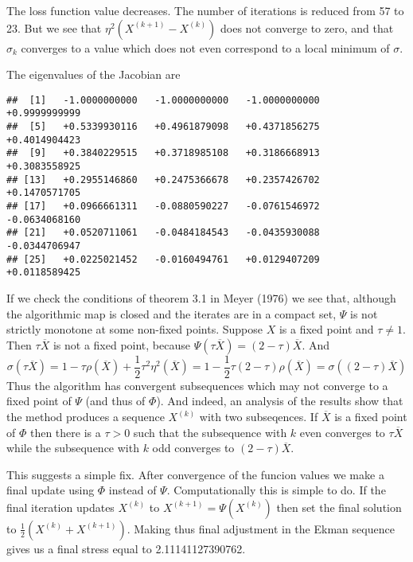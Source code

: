 \documentclass[
  12pt,
]{article}
\begin{document}
The loss function value decreases. The number of iterations is reduced from 57 to 23.
But we see that \(\eta^2(X^{(k+1)}-X^{(k)})\) does not converge to zero, and that \(\sigma_k\) converges to a value which does not even correspond to a local minimum of \(\sigma\).

The eigenvalues of the Jacobian are

\begin{verbatim}
##  [1]   -1.0000000000   -1.0000000000   -1.0000000000   +0.9999999999
##  [5]   +0.5339930116   +0.4961879098   +0.4371856275   +0.4014904423
##  [9]   +0.3840229515   +0.3718985108   +0.3186668913   +0.3083558925
## [13]   +0.2955146860   +0.2475366678   +0.2357426702   +0.1470571705
## [17]   +0.0966661311   -0.0880590227   -0.0761546972   -0.0634068160
## [21]   +0.0520711061   -0.0484184543   -0.0435930088   -0.0344706947
## [25]   +0.0225021452   -0.0160494761   +0.0129407209   +0.0118589425
\end{verbatim}

If we check the conditions of theorem 3.1 in Meyer (1976) we see that, although the
algorithmic map is closed and the iterates are in a compact set, \(\Psi\)
is not strictly monotone at some non-fixed points. Suppose \(X\) is a fixed point and \(\tau\not= 1\). Then
\(\tau\overline{X}\) is not a fixed point, because
\(\Psi(\tau\overline{X})=(2-\tau)\overline{X}\). And
\begin{equation}
\sigma(\tau\overline{X})=1-\tau\rho(\overline{X})+\frac12\tau^2\eta^2(\overline{X})=
1-\frac12\tau(2-\tau)\rho(\overline{X})=\sigma((2-\tau)\overline{X})
\end{equation}
Thus the algorithm has convergent subsequences which may not converge to a fixed
point of \(\Psi\) (and thus of \(\Phi\)). And indeed, an analysis of the results show that the method produces a sequence \(X^{(k)}\) with two subseqences. If \(\overline{X}\) is a fixed point of \(\Phi\) then there is a \(\tau>0\) such that
the subsequence with \(k\) even converges to \(\tau\overline{X}\)
while the subsequence with \(k\) odd converges to \((2-\tau)\overline{X}\).

This suggests a simple fix. After convergence of the funcion values we make
a final update using \(\Phi\) instead of \(\Psi\). Computationally this is simple to do. If the final iteration updates \(X^{(k)}\) to \(X^{(k+1)}=\Psi(X^{(k)})\) then
set the final solution to \(\frac12(X^{(k)}+X^{(k+1)})\). Making thus final
adjustment in the Ekman sequence gives us a final stress equal to 2.11141127390762.
\end{document}

